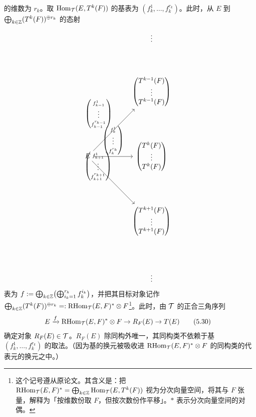 的维数为 $r_{k}$。取 $\operatorname{Hom}_{\mathcal{T}}(E,T^{k}(F))$ 的基表为 $(f^{1}_{k},\ldots,f^{r_{k}}_{k})$。此时，从 $E$ 到 $\bigoplus_{k\in\mathbb{Z}}(T^{k}(F))^{\oplus r_{k}}$ 的态射
\[
\begin{tikzcd}[row sep=4.4em, column sep=5.2em]
  & \vdots \\
  & \begin{pmatrix} T^{k-1}(F)\\ \vdots\\ T^{k-1}(F)\end{pmatrix}\\
  E \arrow[ru, "{\begin{pmatrix} f^{1}_{k-1}\\ \vdots\\ f^{r_{k-1}}_{k-1}\end{pmatrix}}" above left]
    \arrow[r, "{\begin{pmatrix} f^{1}_{k}\\ \vdots\\ f^{r_{k}}_{k}\end{pmatrix}}" above]
    \arrow[rd, "{\begin{pmatrix} f^{1}_{k+1}\\ \vdots\\ f^{r_{k+1}}_{k+1}\end{pmatrix}}" above left]
  & \begin{pmatrix} T^{k}(F)\\ \vdots\\ T^{k}(F)\end{pmatrix}\\
  & \begin{pmatrix} T^{k+1}(F)\\ \vdots\\ T^{k+1}(F)\end{pmatrix}\\
  & \vdots
\end{tikzcd}
\]
表为 $f := \bigoplus_{k\in\mathbb{Z}}\bigl(\bigoplus_{i_{k}=1}^{r_{k}}f^{i_{k}}_{k}\bigr)$，并把其目标对象记作 $\bigoplus_{k\in\mathbb{Z}}(T^{k}(F))^{\oplus r_{k}} =: \operatorname{RHom}_{\mathcal{T}}(E,F)^{*}\otimes F$\footnote{这个记号遵从原论文。其含义是：把 $\operatorname{RHom}_{\mathcal{T}}(E,F)^{*} = \bigoplus_{k\in\mathbb{Z}}\operatorname{Hom}_{\mathcal{T}}(E,T^{k}(F))$ 视为分次向量空间，将其与 $F$ 张量，解释为「按维数份取 $F$，但按次数份作平移」。$*$ 表示分次向量空间的对偶。}。此时，由 $\mathcal{T}$ 的正合三角序列
\begin{equation}
  E \xrightarrow{f} \operatorname{RHom}_{\mathcal{T}}(E,F)^{*}\otimes F \to R_{F}(E) \to T(E) \tag{5.30}
\end{equation}
确定对象 $R_{F}(E) \in \mathcal{T}$。$R_{F}(E)$ 除同构外唯一，其同构类不依赖于基 $(f^{1}_{k},\ldots,f^{r_{k}}_{k})$ 的取法。（因为基的换元被吸收进 $\operatorname{RHom}_{\mathcal{T}}(E,F)^{*}\otimes F$ 的同构类的代表元的换元之中。）

